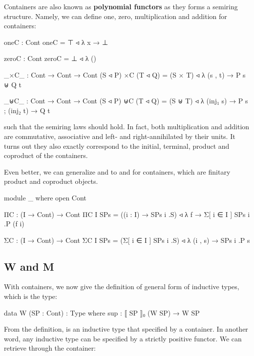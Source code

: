 Containers are also known as \textbf{polynomial functors} as they forms a semiring structure. Namely, we can define one, zero, multiplication and addition for containers:

\begin{code}
oneC : Cont
oneC = ⊤ ◃ λ x → ⊥

zeroC : Cont
zeroC = ⊥ ◃ λ ()

_×C_ : Cont → Cont → Cont
(S ◃ P) ×C (T ◃ Q) = (S × T) ◃ λ (s , t) → P s ⊎ Q t

_⊎C_ : Cont → Cont → Cont
(S ◃ P) ⊎C (T ◃ Q) = (S ⊎ T) ◃ λ{ (inj₁ s) → P s ; (inj₂ t) → Q t }
\end{code}

such that the semiring laws should hold. In fact, both multiplication and addition are commutative, associative and left- and right-annihilated by their units. It turns out they also exactly correspond to the initial, terminal, product and coproduct of the containers. 

Even better, we can generalize  and  to  and  for containers, which are finitary product and coproduct objects.

\begin{code}[hide]
module _ where
  open Cont
\end{code}

\begin{code}
  ΠC : (I → Cont) → Cont
  ΠC {I} SPs = ((i : I) → SPs i .S) ◃ λ f → Σ[ i ∈ I ] SPs i .P (f i)

  ΣC : (I → Cont) → Cont
  ΣC {I} SPs = (Σ[ i ∈ I ] SPs i .S) ◃ λ (i , s) → SPs i .P s
\end{code}

\subsection{W and M}

With containers, we now give the definition of general form of inductive types, which is the  type:

\begin{code}
data W (SP : Cont) : Type where
  sup : ⟦ SP ⟧₀ (W SP) → W SP
\end{code}

From the definition,  is an inductive type that specified by a container. In another word, any inductive type can be specified by a strictly positive functor. We can retrieve  through the  container:

